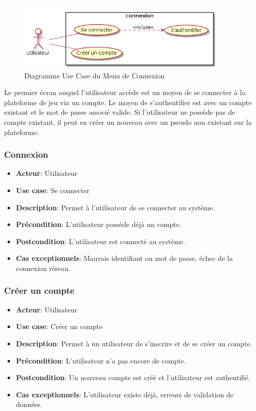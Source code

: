 \documentclass{article}
\begin{document}
\begin{figure}[!h]
    \centering
    	\includegraphics[width=0.9\textwidth]{../res/uml/usecase/ConnexionUseCase.png}
    	\caption{Diagramme Use Case du Menu de Connexion}
    	\label{fig:main-menu}
\end{figure}
Le premier écran auquel l'utilisateur accède est un moyen de se connecter à la plateforme de jeu via un compte. Le moyen de s'authentifier est avec un compte existant et le mot de passe associé valide. Si l'utilisateur ne possède pas de compte existant, il peut en créer un nouveau avec un pseudo non existant sur la plateforme.


\subsubsection*{Connexion}
\begin{itemize}
    \item \textbf{Acteur}: Utilisateur
    \item \textbf{Use case}: Se connecter
    \item \textbf{Description}: Permet à l'utilisateur de se connecter au système.
    \item \textbf{Précondition}: L'utilisateur possède déjà un compte.
    \item \textbf{Postcondition}: L'utilisateur est connecté au système.
    \item \textbf{Cas exceptionnels}: Mauvais identifiant ou mot de passe, échec de la connexion réseau.
\end{itemize}

\subsubsection*{Créer un compte}
\begin{itemize}
    \item \textbf{Acteur}: Utilisateur
    \item \textbf{Use case}: Créer un compte
    \item \textbf{Description}: Permet à un utilisateur de s’inscrire et de se créer un compte.
    \item \textbf{Précondition}: L’utilisateur n’a pas encore de compte.
    \item \textbf{Postcondition}: Un nouveau compte est créé et l'utilisateur est authentifié.
    \item \textbf{Cas exceptionnels}: L'utilisateur existe déjà, erreurs de validation de données.
\end{itemize}
\end{document}
